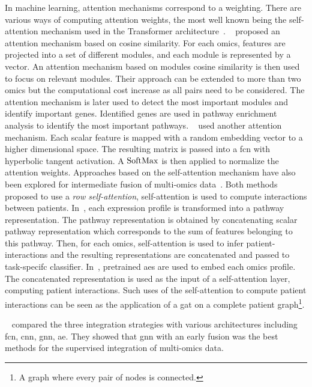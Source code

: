 \documentclass[../main.tex]{subfiles}
\begin{document}
		In machine learning, attention mechanisms correspond to a weighting.
		There are various ways of computing attention weights, the most well known being the self-attention mechanism used in the Transformer architecture~\cite{AttentionAllYouNeed}.
		\citeauthor{MOMA}~\cite{MOMA} proposed an attention mechanism based on cosine similarity.
		For each omics, features are projected into a set of different modules, and each module is represented by a vector.
		An attention mechanism based on modules cosine similarity is then used to focus on relevant modules.
		Their approach can be extended to more than two omics but the computational cost increase as all pairs need to be considered.
		The attention mechanism is later used to detect the most important modules and identify important genes.
		Identified genes are used in pathway enrichment analysis to identify the most important pathways.
		\citeauthor{moBRCA}~\cite{moBRCA} used another attention mechanism.
		Each scalar feature is mapped with a random embedding vector to a higher dimensional space.
		The resulting matrix is passed into a \gls{fcn} with hyperbolic tangent activation.
		A \(\operatorname{SoftMax}\) is then applied to normalize the attention weights.
		Approaches based on the self-attention mechanism have also been explored for intermediate fusion of multi-omics data~\cite{Yao_2024,Lan2024}.
		Both methods proposed to use a \emph{row self-attention}, self-attention is used to compute interactions between patients.
		In~\cite{Lan2024}, each expression profile is transformed into a pathway representation.
		The pathway representation is obtained by concatenating scalar pathway representation which corresponds to the sum of features belonging to this pathway.
		Then, for each omics, self-attention is used to infer patient-interactions and the resulting representations are concatenated and passed to task-specifc classifier.
		In~\cite{Yao_2024}, pretrained \glspl{ae} are used to embed each omics profile.
		The concatenated representation is used as the input of a self-attention layer, computing patient interactions.
		Such uses of the self-attention to compute patient interactions can be seen as the application of a \gls{gat} on a complete patient graph\footnote{A graph where every pair of nodes is connected.}.

		\ifSubfilesClassLoaded{%
		}{
		}

		\citeauthor{Leng2022}~\cite{Leng2022} compared the three integration strategies with various architectures including \gls{fcn}, \gls{cnn}, \gls{gnn}, \gls{ae}.
		They showed that \gls{gnn} with an early fusion was the best methods for the supervised integration of multi-omics data.
\end{document}
